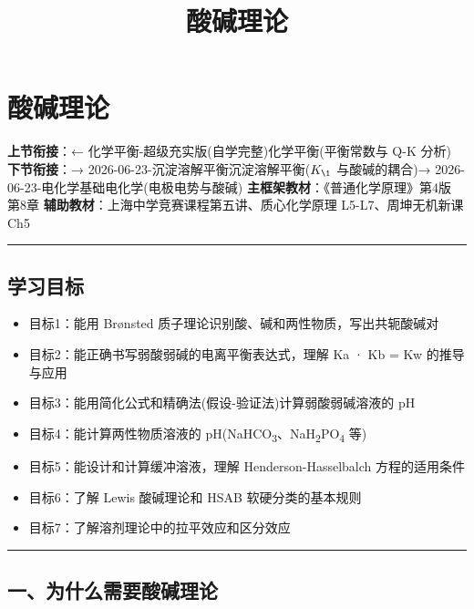 \documentclass[a4paper,11pt]{ctexart}
\title{酸碱理论}
\date{}
\providecommand{\tightlist}{\setlength{\itemsep}{0pt}\setlength{\parskip}{0pt}}
\begin{document}
\maketitle
\tableofcontents
\newpage
\section{酸碱理论}\label{ux9178ux78b1ux7406ux8bba}

\textbf{上节衔接}：← 化学平衡-超级充实版(自学完整)\textbar 化学平衡(平衡常数与 Q-K 分析)
\textbf{下节衔接}：→ 2026-06-23-沉淀溶解平衡\textbar 沉淀溶解平衡(\(K_{\1}\) 与酸碱的耦合)→ 2026-06-23-电化学基础\textbar 电化学(电极电势与酸碱)
\textbf{主框架教材}：《普通化学原理》第4版 第8章
\textbf{辅助教材}：上海中学竞赛课程第五讲、质心化学原理 L5-L7、周坤无机新课 Ch5

\begin{center}\rule{0.5\linewidth}{0.5pt}\end{center}

\subsection{学习目标}\label{ux5b66ux4e60ux76eeux6807}

\begin{itemize}
\tightlist
\item
  目标1：能用 Brønsted 质子理论识别酸、碱和两性物质，写出共轭酸碱对
\item
  目标2：能正确书写弱酸弱碱的电离平衡表达式，理解 Ka · Kb = Kw 的推导与应用
\item
  目标3：能用简化公式和精确法(假设-验证法)计算弱酸弱碱溶液的 pH
\item
  目标4：能计算两性物质溶液的 pH(NaHCO\textsubscript{3}、NaH\textsubscript{2}PO\textsubscript{4} 等)
\item
  目标5：能设计和计算缓冲溶液，理解 Henderson-Hasselbalch 方程的适用条件
\item
  目标6：了解 Lewis 酸碱理论和 HSAB 软硬分类的基本规则
\item
  目标7：了解溶剂理论中的拉平效应和区分效应
\end{itemize}

\begin{center}\rule{0.5\linewidth}{0.5pt}\end{center}

\subsection{一、为什么需要酸碱理论}\label{ux4e00ux4e3aux4ec0ux4e48ux9700ux8981ux9178ux78b1ux7406ux8bba}
\end{document}
